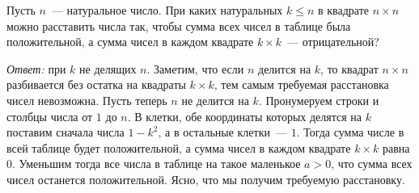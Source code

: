 Пусть $n$~--- натуральное число.
При каких натуральных $k \leq n$ в квадрате $n \times n$ можно расставить числа
так, чтобы сумма всех чисел в таблице была положительной, а сумма чисел в каждом
квадрате $k \times k$~--- отрицательной?

\solution
\emph{Ответ:} при $k$ не делящих $n$.
Заметим, что если $n$ делится на $k$, то квадрат $n \times n$ разбивается без
остатка на квадраты $k \times k$, тем самым требуемая расстановка чисел
невозможна.
Пусть теперь $n$ не делится на $k$.
Пронумеруем строки и столбцы числа от $1$ до $n$.
В клетки, обе координаты которых делятся на $k$ поставим сначала числа
$1 - k^2$, а в остальные клетки~--- $1$.
Тогда сумма числе в всей таблице будет положительной, а сумма чисел в каждом
квадрате $k \times k$ равна $0$.
Уменьшим тогда все числа в таблице на такое маленькое $a > 0$, что сумма всех
чисел останется положительной.
Ясно, что мы получим требуемую расстановку.

